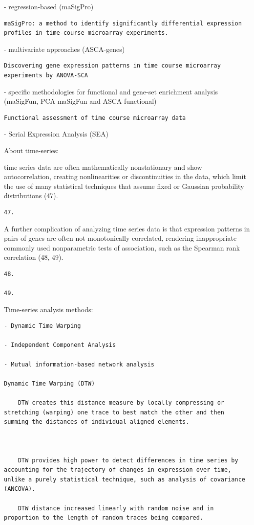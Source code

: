 \documentclass[
]{book}
\begin{document}
- regression-based (maSigPro)

\begin{verbatim}
maSigPro: a method to identify significantly differential expression profiles in time-course microarray experiments.
\end{verbatim}

- multivariate approaches (ASCA-genes)

\begin{verbatim}
Discovering gene expression patterns in time course microarray experiments by ANOVA-SCA
\end{verbatim}

- specific methodologies for functional and gene-set enrichment analysis (maSigFun, PCA-maSigFun and ASCA-functional)

\begin{verbatim}
Functional assessment of time course microarray data
\end{verbatim}

- Serial Expression Analysis (SEA)

About time-series:

time series data are often mathematically nonstationary and show autocorrelation, creating nonlinearities or discontinuities in the data, which limit the use of many statistical techniques that assume fixed or Gaussian probability distributions (47).

\begin{verbatim}
47.
\end{verbatim}

A further complication of analyzing time series data is that expression patterns in pairs of genes are often not monotonically correlated, rendering inappropriate commonly used nonparametric tests of association, such as the Spearman rank correlation (48, 49).

\begin{verbatim}
48.

49.
\end{verbatim}

Time-series analysis methods:

\begin{verbatim}
- Dynamic Time Warping

- Independent Component Analysis

- Mutual information-based network analysis

Dynamic Time Warping (DTW)

    DTW creates this distance measure by locally compressing or stretching (warping) one trace to best match the other and then summing the distances of individual aligned elements.



    DTW provides high power to detect differences in time series by accounting for the trajectory of changes in expression over time, unlike a purely statistical technique, such as analysis of covariance (ANCOVA).

    DTW distance increased linearly with random noise and in proportion to the length of random traces being compared.
\end{verbatim}
\end{document}
